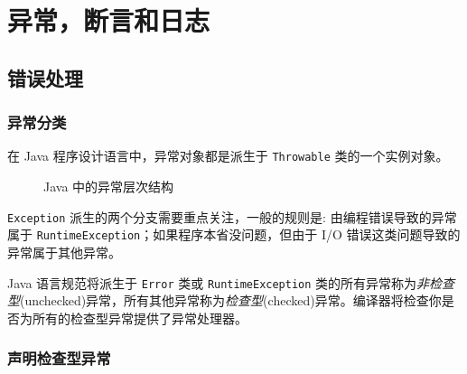\section{异常，断言和日志}

\subsection{错误处理}

\subsubsection{异常分类}

在 Java 程序设计语言中，异常对象都是派生于 \texttt{Throwable} 类的一个实例对象。

\begin{figure}[H]
    \scriptsize
    \centering
    \caption{Java 中的异常层次结构}
    \label{fig:Java 中的异常层次结构}
\end{figure}

\texttt{Exception} 派生的两个分支需要重点关注，一般的规则是: 由编程错误导致的异常属于 \texttt{RuntimeException}；如果程序本省没问题，但由于 I/O 错误这类问题导致的异常属于其他异常。

Java 语言规范将派生于 \texttt{Error} 类或 \texttt{RuntimeException} 类的所有异常称为\textit{非检查型}(unchecked)异常，所有其他异常称为\textit{检查型}(checked)异常。编译器将检查你是否为所有的检查型异常提供了异常处理器。

\subsubsection{声明检查型异常}

